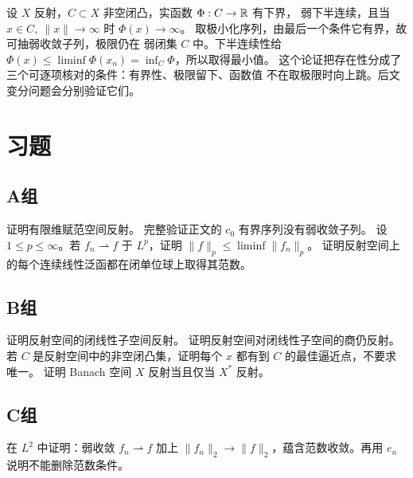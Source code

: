 设 \(X\) 反射，\(C\subset X\) 非空闭凸，实函数 \(\Phi:C\to\mathbb{R}\) 有下界，
弱下半连续，且当 \(x\in C,\ \|x\|\to\infty\) 时 \(\Phi(x)\to\infty\)。
取极小化序列，由最后一个条件它有界，故可抽弱收敛子列，极限仍在
弱闭集 \(C\) 中。下半连续性给
\(\Phi(x)\le\liminf\Phi(x_n)=\inf_C\Phi\)，所以取得最小值。
这个论证把存在性分成了三个可逐项核对的条件：有界性、极限留下、函数值
不在取极限时向上跳。后文变分问题会分别验证它们。

\section*{习题}
\subsection*{A组}
\begin{enumerate}[label=\textbf{\thechapter.\arabic*.}]
证明有限维赋范空间反射。
完整验证正文的 \(c_0\) 有界序列没有弱收敛子列。
设 \(1\le p\le\infty\)。若 \(f_n\rightharpoonup f\) 于 \(L^p\)，证明 \(\|f\|_p\le\liminf\|f_n\|_p\)。
证明反射空间上的每个连续线性泛函都在闭单位球上取得其范数。
\end{enumerate}
\subsection*{B组}
\begin{enumerate}[label=\textbf{\thechapter.\arabic*.},resume]
证明反射空间的闭线性子空间反射。
证明反射空间对闭线性子空间的商仍反射。
若 \(C\) 是反射空间中的非空闭凸集，证明每个 \(x\) 都有到 \(C\) 的最佳逼近点，不要求唯一。
证明 Banach 空间 \(X\) 反射当且仅当 \(X^*\) 反射。
\end{enumerate}
\subsection*{C组}
\begin{enumerate}[label=\textbf{\thechapter.\arabic*.},resume]
在 \(L^2\) 中证明：弱收敛 \(f_n\rightharpoonup f\) 加上 \(\|f_n\|_2\to\|f\|_2\)，蕴含范数收敛。再用 \(e_n\) 说明不能删除范数条件。
\end{enumerate}
